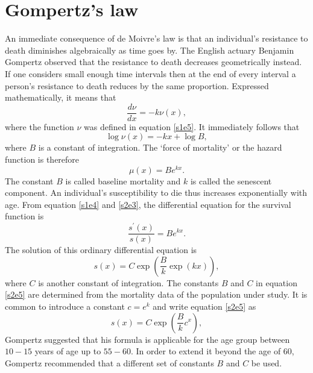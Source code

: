\documentclass{article}
\numberwithin{equation}{section}
\begin{document}
\section{Gompertz's law}\label{s2}
An immediate consequence of de Moivre's law is that an individual's resistance
to death diminishes algebraically as time goes by. The English actuary 
Benjamin Gompertz observed \cite{gompertz1825xxiv} that the resistance to 
death decreases geometrically instead. If one considers small enough time 
intervals then at the end of every interval a person's resistance to death 
reduces by the same proportion. Expressed mathematically, it means that
\begin{equation}\label{s2e1}
\frac{d\nu}{dx} = -k\nu(x),
\end{equation}
where the function $\nu$ was defined in equation \eqref{s1e5}. It immediately
follows that
\begin{equation}\label{s2e2}
\log\nu(x) = -kx + \log B,
\end{equation}
where $B$ is a constant of integration. The `force of mortality' or the
hazard function is therefore
\begin{equation}\label{s2e3}
\mu(x) = Be^{kx}.
\end{equation}
The constant $B$ is called baseline mortality and $k$ is called the 
senescent component.
An individual's susceptibility to die thus increases exponentially with age.
From equation \eqref{s1e4} and \eqref{s2e3}, the differential equation for
the survival function is
\begin{equation}\label{s2e4}
\frac{s^\prime(x)}{s(x)} = Be^{kx}.
\end{equation}
The solution of this ordinary differential equation is
\begin{equation}\label{s2e5}
s(x) = C\exp\left(\frac{B}{k}\exp(kx)\right),
\end{equation}
where $C$ is another constant of integration. The constants $B$ and $C$ in
equation \eqref{s2e5} are determined from the mortality data of the population
under study. It is common to introduce a constant $c = e^k$ and write equation
\eqref{s2e5} as
\begin{equation}\label{s2e6}
s(x) = C\exp\left(\frac{B}{k}c^x\right),
\end{equation}
Gompertz suggested that his formula is applicable for the age
group between $10-15$ years of age up to $55-60$. In order to extend it beyond
the age of $60$, Gompertz recommended that a different set of constants $B$
and $C$ be used.
\end{document}
